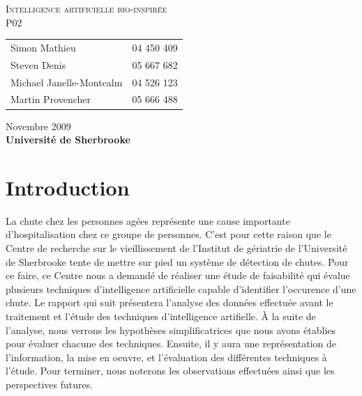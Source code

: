 \documentclass[12pt,letterpaper]{article}
\begin{document}
\renewcommand{\labelitemi}{$\bullet$}
\newcommand{\unit}[1]{\ \mathrm{#1}}
\newcommand{\degree}{\ensuremath{^\circ}}

\thispagestyle{empty}
\begin{center}
	\vspace{20pt}
	\large{\textsc{
		Intelligence artificielle bio-inspirée\\
	}}
	\vspace{20pt}
	\large{\textsc{
		P02
	}}
	\vfill
	\begin{tabular}{ll}
      Simon Mathieu & 04 450 409 \\
      Steven Denis & 05 667 682 \\
      Michael Janelle-Montcalm & 04 526 123 \\
      Martin Provencher &	05 666 488 \\
	\end{tabular}
	\vfill
	Novembre 2009 \\
	\textbf{Université de Sherbrooke}
	\vspace{20pt}
\end{center}
\clearpage
\begin{spacing}{0.1}
\tableofcontents
\end{spacing}
\clearpage

\section{Introduction} %
La chute chez les personnes agées représente une cause importante d'hospitalisation chez ce groupe de personnes. C'est pour cette raison que le Centre de recherche sur le vieillissement de l'Institut de gériatrie de l'Université de Sherbrooke tente de mettre sur pied un système de détection de chutes. Pour ce faire, ce Centre nous a demandé de réaliser une étude de faisabilité qui évalue plusieurs techniques d'intelligence artificielle capable d'identifier l'occurence d'une chute. Le rapport qui suit présentera l'analyse des données effectuée avant le traitement et l'étude des techniques d'intelligence artifielle. À la suite de l'analyse, nous verrons les hypothèses simplificatrices que nous avons établies pour évaluer chacune des techniques. Ensuite, il y aura une représentation de l'information, la mise en oeuvre, et l'évaluation des différentes techniques à l'étude. Pour terminer, nous noterons les observations effectuées ainsi que les perspectives futures.
\end{document}
